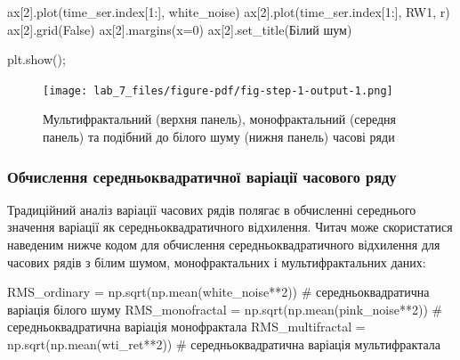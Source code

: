 \documentclass[
  letterpaper,
]{report}
\newenvironment{Shaded}{\begin{snugshade}}{\end{snugshade}}
\newcommand{\CommentTok}[1]{\textcolor[rgb]{0.37,0.37,0.37}{#1}}
\newcommand{\DecValTok}[1]{\textcolor[rgb]{0.68,0.00,0.00}{#1}}
\newcommand{\NormalTok}[1]{\textcolor[rgb]{0.00,0.23,0.31}{#1}}
\newcommand{\OperatorTok}[1]{\textcolor[rgb]{0.37,0.37,0.37}{#1}}
\newcommand{\StringTok}[1]{\textcolor[rgb]{0.13,0.47,0.30}{#1}}
\newcommand{\VariableTok}[1]{\textcolor[rgb]{0.07,0.07,0.07}{#1}}
\begin{document}
\begin{Shaded}
\begin{Highlighting}[]
\NormalTok{ax[}\DecValTok{2}\NormalTok{].plot(time\_ser.index[}\DecValTok{1}\NormalTok{:], white\_noise)}
\NormalTok{ax[}\DecValTok{2}\NormalTok{].plot(time\_ser.index[}\DecValTok{1}\NormalTok{:], RW1, }\StringTok{\textquotesingle{}r\textquotesingle{}}\NormalTok{)}
\NormalTok{ax[}\DecValTok{2}\NormalTok{].grid(}\VariableTok{False}\NormalTok{)}
\NormalTok{ax[}\DecValTok{2}\NormalTok{].margins(x}\OperatorTok{=}\DecValTok{0}\NormalTok{)}
\NormalTok{ax[}\DecValTok{2}\NormalTok{].set\_title(}\StringTok{\textquotesingle{}Білий шум\textquotesingle{}}\NormalTok{)}

\NormalTok{plt.show()}\OperatorTok{;}
\end{Highlighting}
\end{Shaded}

\begin{figure}[H]

{\centering \texttt{[image: lab\_7\_files/figure-pdf/fig-step-1-output-1.png]}

}

\caption{\label{fig-step-1}Мультифрактальний (верхня панель),
монофрактальний (середня панель) та подібний до білого шуму (нижня
панель) часові ряди}

\end{figure}

\hypertarget{ux43eux431ux447ux438ux441ux43bux435ux43dux43dux44f-ux441ux435ux440ux435ux434ux43dux44cux43eux43aux432ux430ux434ux440ux430ux442ux438ux447ux43dux43eux457-ux432ux430ux440ux456ux430ux446ux456ux457-ux447ux430ux441ux43eux432ux43eux433ux43e-ux440ux44fux434ux443}{%
\subsubsection{Обчислення середньоквадратичної варіації часового
ряду}\label{ux43eux431ux447ux438ux441ux43bux435ux43dux43dux44f-ux441ux435ux440ux435ux434ux43dux44cux43eux43aux432ux430ux434ux440ux430ux442ux438ux447ux43dux43eux457-ux432ux430ux440ux456ux430ux446ux456ux457-ux447ux430ux441ux43eux432ux43eux433ux43e-ux440ux44fux434ux443}}

Традиційний аналіз варіації часових рядів полягає в обчисленні
середнього значення варіації як середньоквадратичного відхилення. Читач
може скористатися наведеним нижче кодом для обчислення
середньоквадратичного відхилення для часових рядів з білим шумом,
монофрактальних і мультифрактальних даних:

\begin{Shaded}
\begin{Highlighting}[]
\NormalTok{RMS\_ordinary }\OperatorTok{=}\NormalTok{ np.sqrt(np.mean(white\_noise}\OperatorTok{**}\DecValTok{2}\NormalTok{))    }\CommentTok{\# середньоквадратична варіація білого шуму}
\NormalTok{RMS\_monofractal }\OperatorTok{=}\NormalTok{ np.sqrt(np.mean(pink\_noise}\OperatorTok{**}\DecValTok{2}\NormalTok{))  }\CommentTok{\# середньоквадратична варіація монофрактала}
\NormalTok{RMS\_multifractal }\OperatorTok{=}\NormalTok{ np.sqrt(np.mean(wti\_ret}\OperatorTok{**}\DecValTok{2}\NormalTok{))    }\CommentTok{\# середньоквадратична варіація мультифрактала}
\end{Highlighting}
\end{Shaded}
\end{document}
